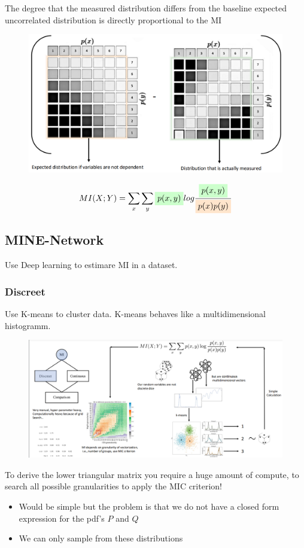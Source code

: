 The degree that the measured distribution differs from the baseline expected uncorrelated distribution is directly proportional to the MI
\begin{figure}[h!]
    \includegraphics[width = \columnwidth]{figures/XAI3/MI.png}
\end{figure}
\[
MI(X;Y) = \sum_{x} \sum_{y} \colorbox{green!20}{$p(x,y)$} log \frac{\colorbox{green!20}{$p(x,y)$}}{\colorbox{orange!20}{$p(x)p(y)$}}
\]


\subsection{MINE-Network}
Use Deep learning to estimare MI in a dataset.
\subsubsection{Discreet}
Use K-means to cluster data.
K-means behaves like a multidimensional histogramm.
\begin{figure}[h!]
    \includegraphics[width = \columnwidth]{figures/XAI3/DiscreetMINE.png}
\end{figure}

To derive the lower triangular matrix you require a huge amount of compute, to search all possible granularities to apply the MIC criterion!
\begin{itemize}
    \item Would be simple but the problem is that we do not have a closed form expression for the pdf's \(P\) and \(Q \)
    \item We can only sample from these distributions
\end{itemize}
